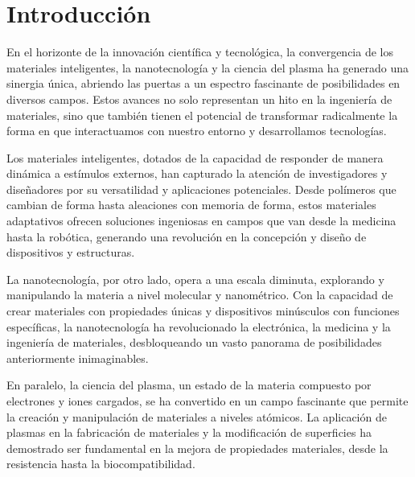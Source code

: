 \section*{Introducci\'on}
En el horizonte de la innovación científica y tecnológica, la convergencia de los materiales inteligentes, la nanotecnología y la ciencia del plasma ha generado una sinergia única, abriendo las puertas a un espectro fascinante de posibilidades en diversos campos. Estos avances no solo representan un hito en la ingeniería de materiales, sino que también tienen el potencial de transformar radicalmente la forma en que interactuamos con nuestro entorno y desarrollamos tecnologías.

Los materiales inteligentes, dotados de la capacidad de responder de manera dinámica a estímulos externos, han capturado la atención de investigadores y diseñadores por su versatilidad y aplicaciones potenciales. Desde polímeros que cambian de forma hasta aleaciones con memoria de forma, estos materiales adaptativos ofrecen soluciones ingeniosas en campos que van desde la medicina hasta la robótica, generando una revolución en la concepción y diseño de dispositivos y estructuras.

La nanotecnología, por otro lado, opera a una escala diminuta, explorando y manipulando la materia a nivel molecular y nanométrico. Con la capacidad de crear materiales con propiedades únicas y dispositivos minúsculos con funciones específicas, la nanotecnología ha revolucionado la electrónica, la medicina y la ingeniería de materiales, desbloqueando un vasto panorama de posibilidades anteriormente inimaginables.

En paralelo, la ciencia del plasma, un estado de la materia compuesto por electrones y iones cargados, se ha convertido en un campo fascinante que permite la creación y manipulación de materiales a niveles atómicos. La aplicación de plasmas en la fabricación de materiales y la modificación de superficies ha demostrado ser fundamental en la mejora de propiedades materiales, desde la resistencia hasta la biocompatibilidad.